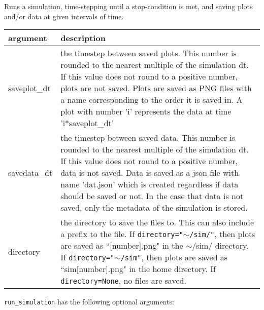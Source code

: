 \documentclass[10pt,a4paper]{article}
\newenvironment{arglist}
    {\begin{center}
    \begin{tabular}{l|p{12cm}}
    argument & description\\
    \hline
    }
    { 
    \end{tabular} 
    \end{center}
    }
\begin{document}
Runs a simulation, time-stepping until a stop-condition is met, and saving plots and/or data at given intervals of time.
\begin{arglist}
saveplot\_dt & the timestep between saved plots. This number is rounded
                    to the nearest multiple of the simulation dt. If this
                    value does not round to a positive number, plots are not
                    saved. Plots are saved as PNG files with a name
                    corresponding to the order it is saved in. A plot with
                    number 'i' represents the data at time 'i*saveplot\_dt'\\\hline

savedata\_dt &
                   the timestep between saved data. This number is rounded
                    to the nearest multiple of the simulation dt. If this
                    value does not round to a positive number, data is not
                    saved. Data is saved as a json file with name 'dat.json'
                    which is created regardless if data should be saved or not.
                    In the case that data is not saved, only the metadata of
                    the simulation is stored.\\\hline
        
        directory &
                   the directory to save the files to. This can also include
                    a prefix to the file. If \texttt{directory="$\sim$/sim/"}, then plots are
                    saved as ``[number].png" in the $\sim$/sim/ directory. If
                    \texttt{directory="$\sim$/sim"}, then plots are saved as
                    ``sim[number].png" in the home directory. If \texttt{directory=None}, no files
                    are saved.\\\hline
\end{arglist}

\texttt{run\_simulation} has the following optional arguments:
\end{document}

